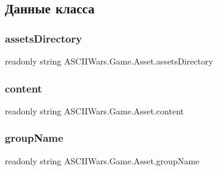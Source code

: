 \subsection{Данные класса}
\hypertarget{class_a_s_c_i_i_wars_1_1_game_1_1_asset_ac77e5c7b34bf76f64cc56e2519e4ef10}{}\label{class_a_s_c_i_i_wars_1_1_game_1_1_asset_ac77e5c7b34bf76f64cc56e2519e4ef10} 
\subsubsection{\texorpdfstring{assets\+Directory}{assetsDirectory}}
{\footnotesize\ttfamily readonly string A\+S\+C\+I\+I\+Wars.\+Game.\+Asset.\+assets\+Directory}

\hypertarget{class_a_s_c_i_i_wars_1_1_game_1_1_asset_a6be81140383341818eaea6ffd8c6c29b}{}\label{class_a_s_c_i_i_wars_1_1_game_1_1_asset_a6be81140383341818eaea6ffd8c6c29b} 
\subsubsection{\texorpdfstring{content}{content}}
{\footnotesize\ttfamily readonly string A\+S\+C\+I\+I\+Wars.\+Game.\+Asset.\+content}

\hypertarget{class_a_s_c_i_i_wars_1_1_game_1_1_asset_abdde541a3e0a35d1f80de3ceaea7db50}{}\label{class_a_s_c_i_i_wars_1_1_game_1_1_asset_abdde541a3e0a35d1f80de3ceaea7db50} 
\subsubsection{\texorpdfstring{group\+Name}{groupName}}
{\footnotesize\ttfamily readonly string A\+S\+C\+I\+I\+Wars.\+Game.\+Asset.\+group\+Name}

\hypertarget{class_a_s_c_i_i_wars_1_1_game_1_1_asset_ab69cdc626d285fd7e8415f0b7cb25f54}{}\label{class_a_s_c_i_i_wars_1_1_game_1_1_asset_ab69cdc626d285fd7e8415f0b7cb25f54} 
